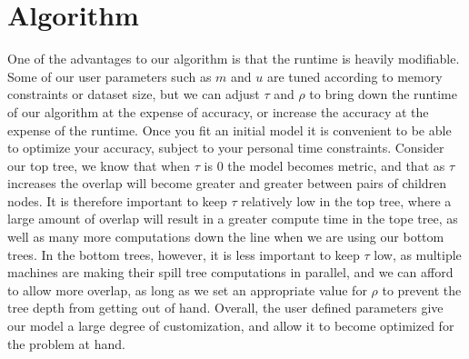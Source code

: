 \chapter{Algorithm}




One of the advantages to our algorithm is that the runtime is heavily 
modifiable.  Some of our user parameters such as $m$ and $u$ are tuned according
to memory constraints or dataset size, but we can adjust $\tau$ and $\rho$ to 
bring down the runtime of our algorithm at the expense of accuracy, or increase 
the accuracy at the expense of the runtime.  Once you fit an initial model it is 
convenient to be able to optimize your accuracy, subject to your personal time 
constraints.  Consider our top tree, we know that when $\tau$ is 0 the model 
becomes metric, and that as $\tau$ increases the overlap will become greater and 
greater between pairs of children nodes.  It is therefore important to keep 
$\tau$ relatively low in the top tree, where a large amount of overlap will 
result in a greater compute time in the tope tree, as well as many more 
computations down the line when we are using our bottom trees.  In the bottom 
trees, however, it is less important to keep $\tau$ low, as multiple machines 
are making their spill tree computations in parallel, and we can afford to allow 
more overlap, as long as we set an appropriate value for $\rho$ to prevent the 
tree depth from getting out of hand.  Overall, the user defined parameters give 
our model a large degree of customization, and allow it to become optimized for 
the problem at hand.